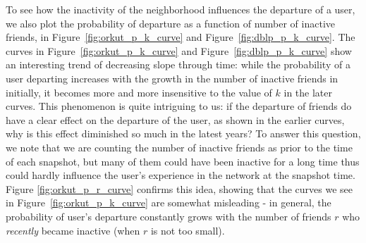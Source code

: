 \documentclass[phd,tocprelim]{cornell}
\begin{document}
To see how the inactivity of the neighborhood influences the departure of a user, we also plot the probability of departure as a function of number of inactive friends, in Figure~\ref{fig:orkut_p_k_curve} and Figure~\ref{fig:dblp_p_k_curve}. The curves in Figure~\ref{fig:orkut_p_k_curve} and Figure~\ref{fig:dblp_p_k_curve} show an interesting trend of decreasing slope through time: while the probability of a user departing increases with the growth in the number of inactive friends in initially, it becomes more and more insensitive to the value of $k$ in the later curves. This phenomenon is quite intriguing to us: if the departure of friends do have a clear effect on the departure of the user, as shown in the earlier curves, why is this effect diminished so much in the latest years? To answer this question, we note that we are counting the number of inactive friends as prior to the time of each snapshot, but many of them could have been inactive for a long time thus could hardly influence the user's experience in the network at the snapshot time. Figure \ref{fig:orkut_p_r_curve} confirms this idea, showing that the curves we see in Figure~\ref{fig:orkut_p_k_curve} are somewhat misleading -  in general, the probability of user's departure constantly grows with the number of friends $r$ who \emph{recently} became inactive (when $r$ is not too small). 
 


\end{document}
